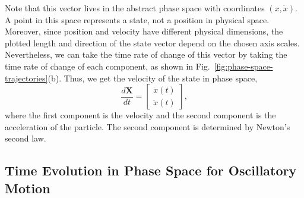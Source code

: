 \documentclass[12pt]{article}
\begin{document}
Note that this vector lives in the abstract phase space with coordinates $(x,\dot{x})$. A point in this space represents a state, not a position in physical space. Moreover, since position and velocity have different physical dimensions, the plotted length and direction of the state vector depend on the chosen axis scales. Nevertheless, we can take the time rate of change of this vector by taking the time rate of change of each component, as shown in Fig.~\ref{fig:phase-space-trajectories}(b). Thus, we get the velocity of the state in phase space,
\begin{equation}
    \frac{d\mathbf{X}}{dt}=\begin{bmatrix}\dot{x}(t)\\\ddot{x}(t)\end{bmatrix},
\end{equation}
where the first component is the velocity and the second component is the acceleration of the particle. The second component is determined by Newton's second law.


\subsection{Time Evolution in Phase Space for Oscillatory Motion}
\end{document}
